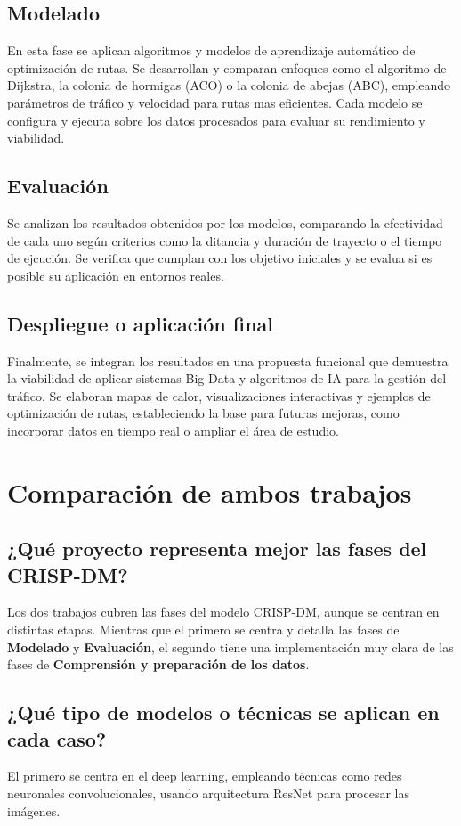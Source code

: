 \documentclass{../../../miPlantilla}
\begin{document}
\subsection{Modelado}
En esta fase se aplican algoritmos y modelos de aprendizaje automático de optimización de rutas.
Se desarrollan y comparan enfoques como el algoritmo de Dijkstra, la colonia de hormigas (ACO)
o la colonia de abejas (ABC), empleando parámetros de tráfico y velocidad para rutas mas eficientes.
Cada modelo se configura y ejecuta sobre los datos procesados para evaluar su rendimiento y viabilidad.

\subsection{Evaluación}
Se analizan los resultados obtenidos por los modelos, comparando la efectividad de cada uno 
según criterios como la ditancia y duración de trayecto o el tiempo de ejcución. Se verifica
que cumplan con los objetivo iniciales y se evalua si es posible su aplicación en entornos reales.

\subsection{Despliegue o aplicación final}
Finalmente, se integran los resultados en una propuesta funcional que demuestra la viabilidad 
de aplicar sistemas Big Data y algoritmos de IA para la gestión del tráfico. Se elaboran mapas 
de calor, visualizaciones interactivas y ejemplos de optimización de rutas, estableciendo la 
base para futuras mejoras, como incorporar datos en tiempo real o ampliar el área de estudio.

\section{Comparación de ambos trabajos}

\subsection{¿Qué proyecto representa mejor las fases del CRISP-DM?}
Los dos trabajos cubren las fases del modelo CRISP-DM, aunque se centran en distintas etapas.
Mientras que el primero se centra y detalla las fases de \textbf{Modelado} y \textbf{Evaluación},
el segundo tiene una implementación muy clara de las fases de \textbf{Comprensión y preparación 
de los datos}.

\subsection{¿Qué tipo de modelos o técnicas se aplican en cada caso?}
El primero se centra en el deep learning, empleando técnicas como redes neuronales convolucionales,
usando arquitectura ResNet para procesar las imágenes.
\end{document}
